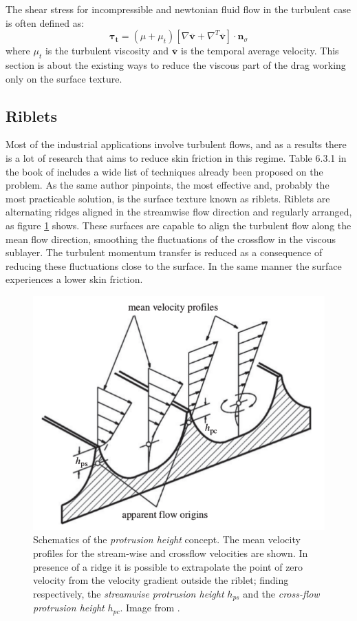 \noindent The shear stress for incompressible and newtonian fluid flow in the turbulent case is often defined as:
\begin{equation}
\boldsymbol{\tau_t} =  (\mu + \mu_t)\left[ \nabla \mathbf{\overline{v}} +  \nabla^T  \mathbf{\overline{v}} \right] \cdot  \mathbf{n}_{\sigma}
\end{equation}
where $\mu_t$ is the turbulent viscosity and $\mathbf{\overline{v}}$ is the temporal average velocity.
This section is about the existing ways to reduce the viscous part of the drag working only on the surface texture.

\subsection{Riblets}
Most of the industrial applications involve turbulent flows, and as a results there is a lot of research that aims to reduce skin friction in this regime.
Table 6.3.1 in the book of \citet{mclean2012understanding} includes a wide list of techniques already been proposed on the problem.
As the same author pinpoints, the most effective and, probably the most practicable solution, is the surface texture known as riblets.
Riblets are alternating ridges aligned in the streamwise flow direction and regularly arranged, as figure \ref{fig:riblets1} shows.
These surfaces are capable to align the turbulent flow along the mean flow direction, smoothing the fluctuations of the crossflow in the viscous sublayer.
The turbulent momentum transfer is reduced as a consequence of reducing these fluctuations close to the surface. In the same manner the surface experiences a lower skin friction.

\begin{figure}[h]
	\centering
	\includegraphics[width=0.7\linewidth]{chapter_1/riblets3}
	\caption{Schematics of the  \textit{protrusion height} concept. The mean velocity profiles for the stream-wise and crossflow velocities are shown. In presence of a ridge it is possible to extrapolate the point of zero velocity from the velocity gradient outside the riblet; finding respectively, the \textit{streamwise protrusion height} $h_{ps}$ and the \textit{cross-flow protrusion height} $h_{pc}$. Image from \citet{bechert1997experiments}.}
	\label{fig:riblets1}
\end{figure}

